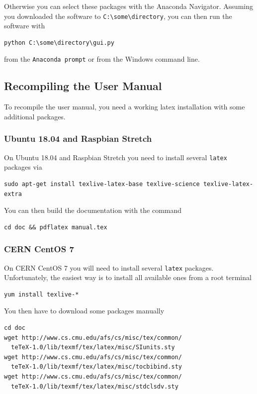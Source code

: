 \documentclass[a4paper]{article}
\begin{document}
Otherwise you can select these packages with the Anaconda Navigator.
Assuming you downloaded the software to {\tt C:\textbackslash some\textbackslash directory}, you can then run the software with

\medskip
\begin{lstlisting}
python C:\some\directory\gui.py
\end{lstlisting}
\medskip

from the {\tt Anaconda prompt} or from the Windows command line.

\subsection{Recompiling the User Manual}

To recompile the user manual, you need a working latex installation with some additional packages.

\subsubsection{Ubuntu 18.04 and Raspbian Stretch}

On Ubuntu 18.04 and Raspbian Stretch you need to install several {\tt latex} packages via

\medskip
\begin{lstlisting}
sudo apt-get install texlive-latex-base texlive-science texlive-latex-extra
\end{lstlisting}
\medskip

You can then build the documentation with the command

\medskip
\begin{lstlisting}
cd doc && pdflatex manual.tex
\end{lstlisting}
\medskip

\subsubsection{CERN CentOS 7}

On CERN CentOS 7 you will need to install several {\tt latex} packages.
Unfortunately, the easiest way is to install all available ones from a root terminal

\medskip
\begin{lstlisting}
yum install texlive-*
\end{lstlisting}
\medskip

You then have to download some packages manually

\medskip
\begin{lstlisting}
cd doc
wget http://www.cs.cmu.edu/afs/cs/misc/tex/common/
  teTeX-1.0/lib/texmf/tex/latex/misc/SIunits.sty
wget http://www.cs.cmu.edu/afs/cs/misc/tex/common/
  teTeX-1.0/lib/texmf/tex/latex/misc/tocbibind.sty
wget http://www.cs.cmu.edu/afs/cs/misc/tex/common/
  teTeX-1.0/lib/texmf/tex/latex/misc/stdclsdv.sty
\end{lstlisting}
\medskip
\end{document}
